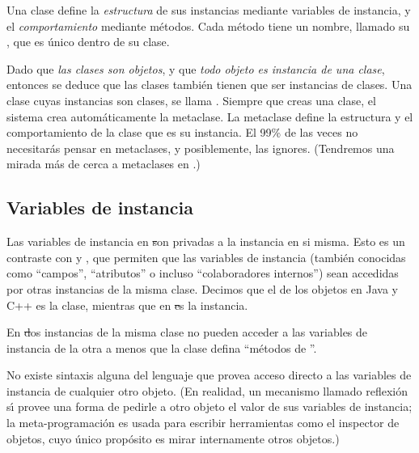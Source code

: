 \documentclass[a4paper,10pt,twoside]{book}
\begin{document}
Una clase define la \emph{estructura} de sus instancias mediante variables de instancia, y el \emph{comportamiento} mediante m\'etodos. Cada m\'etodo tiene un nombre, llamado su , que es \'unico dentro de su clase. 

Dado que \emph{las clases son objetos}, y que \emph{todo objeto es instancia de una clase}, entonces se deduce que las clases tambi\'en tienen que ser instancias de clases. Una clase cuyas instancias son clases, se llama  . Siempre que creas una clase, el sistema crea autom\'aticamente la metaclase. 
La metaclase define la estructura y el comportamiento de la clase que es su instancia. 
El 99\% de las veces no necesitar\'as pensar en metaclases, y posiblemente, las ignores. 
(Tendremos una mirada m\'as de cerca a metaclases en .)

\subsection{Variables de instancia}

Las variables de instancia en \st son privadas a la instancia en si misma. 
Esto es un contraste con  y , que permiten que las variables de instancia (tambi\'en conocidas como ``campos'', ``atributos'' o incluso ``colaboradores internos'') sean accedidas por otras instancias de la misma clase.  
Decimos que el  de los objetos en Java y C++ es la clase, mientras que en \st es la instancia.



En \st dos instancias de la misma clase no pueden acceder a las variables de instancia de la otra a menos que la clase defina ``m\'etodos de ''.


No existe sintaxis alguna del lenguaje que provea acceso directo a las variables de instancia de cualquier otro objeto. 
(En realidad, un mecanismo llamado reflexi\'on s\'\i{} 
provee una forma de pedirle a otro objeto el valor de sus variables de instancia; la meta-programaci\'on es usada para escribir herramientas como el inspector de objetos,
 cuyo \'unico prop\'osito es mirar internamente otros objetos.) 
\end{document}
